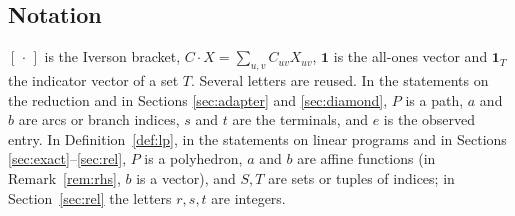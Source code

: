 \documentclass[11pt]{amsart}
\theoremstyle{plain}
\theoremstyle{definition}
\theoremstyle{remark}
\newcommand{\one}{\mathbf{1}}
\begin{document}
\subsection*{Notation}
$[\,\cdot\,]$ is the Iverson bracket, $C\cdot X=\sum_{u,v}C_{uv}X_{uv}$, $\one$ is the all-ones vector and $\one_T$
the indicator vector of a set $T$. Several letters are reused. In the statements on the reduction and in Sections
\ref{sec:adapter} and \ref{sec:diamond}, $P$ is a path, $a$ and $b$ are arcs or branch indices, $s$ and $t$ are the
terminals, and $e$ is the observed entry. In Definition~\ref{def:lp}, in the statements on linear programs and in
Sections \ref{sec:exact}--\ref{sec:rel}, $P$ is a polyhedron, $a$ and $b$ are affine functions (in Remark~\ref{rem:rhs}, $b$ is
a vector), and $S,T$ are sets or tuples of indices; in Section~\ref{sec:rel} the letters $r,s,t$ are integers.
\end{document}
